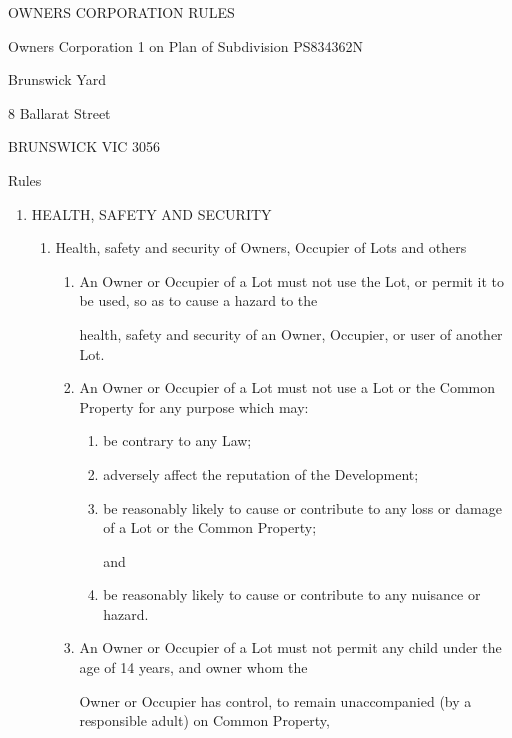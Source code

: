 \documentclass{article}
\begin{document}

OWNERS CORPORATION RULES 

Owners Corporation 1 on Plan of Subdivision PS834362N 

Brunswick Yard 

8 Ballarat Street 

BRUNSWICK VIC 3056 

\newpage

Rules 

\begin{enumerate}[label=\arabic*.]
\item  HEALTH, SAFETY AND SECURITY 

\begin{enumerate}[label=\arabic{enumi}.\arabic*.]
\item  Health, safety and security of Owners, Occupier of Lots and others 

\begin{enumerate}[label=(\arabic*)]
\item  An Owner or Occupier of a Lot must not use the Lot, or permit it to be used, so as to cause a hazard to the 

health, safety and security of an Owner, Occupier, or user of another Lot. 

\item  An Owner or Occupier of a Lot must not use a Lot or the Common Property for any purpose which may: 

\begin{enumerate}[label=(\alph*)]
\item  be contrary to any Law; 

\item  adversely affect the reputation of the Development;  

\item  be reasonably likely to cause or contribute to any loss or damage of a Lot or the Common Property; 

and 

\item  be reasonably likely to cause or contribute to any nuisance or hazard. 

\end{enumerate}
\item  An Owner or Occupier of a Lot must not permit any child under the age of 14 years, and owner whom the 

Owner or Occupier has control, to remain unaccompanied (by a responsible adult) on Common Property, 


\end{enumerate}
\end{enumerate}
\end{enumerate}
\end{document}

